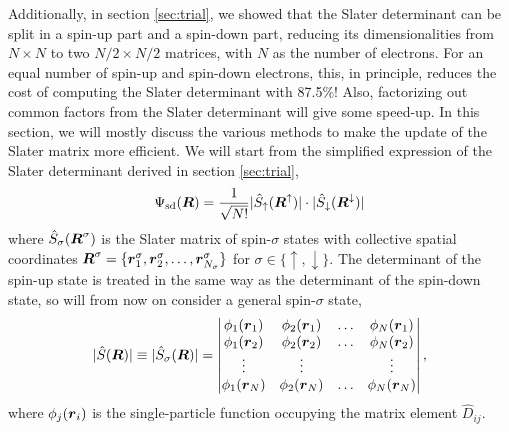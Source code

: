 Additionally, in section \ref{sec:trial}, we showed that the Slater determinant can be split in a spin-up part and a spin-down part, reducing its dimensionalities from $N\times N$ to two $N/2\times N/2$ matrices, with $N$ as the number of electrons. For an equal number of spin-up and spin-down electrons, this, in principle, reduces the cost of computing the Slater determinant with 87.5\%! Also, factorizing out common factors from the Slater determinant will give some speed-up. In this section, we will mostly discuss the various methods to make the update of the Slater matrix more efficient. We will start from the simplified expression of the Slater determinant derived in section \ref{sec:trial},
\begin{equation}
\Psi_{\text{sd}}(\boldsymbol{{R}})=\frac{1}{\sqrt{N!}}|\hat{S}_{\uparrow}(\boldsymbol{{R}}^{\uparrow})|\cdot|\hat{S}_{\downarrow}(\boldsymbol{{R}}^{\downarrow})|
\end{equation}
where $\hat{S}_{\sigma}(\boldsymbol{{R}}^{\sigma})$ is the Slater matrix of spin-$\sigma$ states with collective spatial coordinates $\boldsymbol{{R}}^{\sigma}=\{\boldsymbol{{r}}_1^{\sigma},\boldsymbol{{r}}_2^{\sigma},\hdots,\boldsymbol{{r}}_{N_{\sigma}}^{\sigma}\}$ for $\sigma\in\{\uparrow, \downarrow\}$. The determinant of the spin-up state is treated in the same way as the determinant of the spin-down state, so will from now on consider a general spin-$\sigma$ state,
\begin{equation}
|\hat{S}(\boldsymbol{{R}})|\equiv|\hat{S}_{\sigma}(\boldsymbol{{R}})|=\begin{vmatrix}
\phi_1(\boldsymbol{r}_1) & \phi_2(\boldsymbol{r}_1) & \hdots & \phi_{N}(\boldsymbol{r}_1)\\
\phi_1(\boldsymbol{r}_2) & \phi_2(\boldsymbol{r}_2) & \hdots & \phi_{N}(\boldsymbol{r}_2)\\
\vdots & \vdots & & \vdots \\
\phi_1(\boldsymbol{r}_{N}) & \phi_2(\boldsymbol{r}_{N}) & \hdots & \phi_{N}(\boldsymbol{r}_{N})
\end{vmatrix},
\end{equation}
where $\phi_j(\boldsymbol{{r}}_i)$ is the single-particle function occupying the matrix element $\hat{D}_{ij}$.

